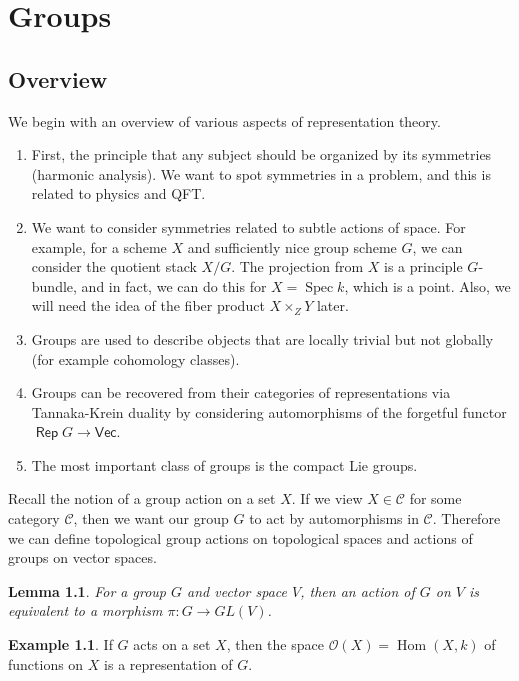 \documentclass[leqno, openany]{memoir}
\newtheorem{lem}[thm]{Lemma}
\theoremstyle{definition}
\newtheorem{exm}[thm]{Example}
\theoremstyle{remark}
\theoremstyle{plain}
\theoremstyle{definition}
\theoremstyle{remark}
\newcommand{\mc}[1]{\mathcal{#1}}
\newcommand{\Vect}{\mathsf{Vec}}
\DeclareMathOperator{\Rep}{\mathsf{Rep}}
\DeclareMathOperator{\Hom}{Hom}
\begin{document}
\chapter{Groups}%
\label{cha:groups}

\section{Overview}%
\label{sec:overview}

We begin with an overview of various aspects of representation theory.
\begin{enumerate}
    \item First, the principle that any subject should be organized by its symmetries (harmonic analysis). We want to spot symmetries in a problem, and this is related to physics and QFT.
    \item We want to consider symmetries related to subtle actions of space. For example, for a scheme $X$ and sufficiently nice group scheme $G$, we can consider the quotient stack $X / G$. The projection from $X$ is a principle $G$-bundle, and in fact, we can do this for $X = \operatorname{Spec} k$, which is a point. Also, we will need the idea of the fiber product $X \times_Z Y$ later.
    \item Groups are used to describe objects that are locally trivial but not globally (for example cohomology classes).
    \item Groups can be recovered from their categories of representations via Tannaka-Krein duality by considering automorphisms of the forgetful functor $\Rep G \to \Vect$.
    \item The most important class of groups is the compact Lie groups.
\end{enumerate}

Recall the notion of a group action on a set $X$. If we view $X \in \mc{C}$ for some category $\mc{C}$, then we want our group $G$ to act by automorphisms in $\mc{C}$. Therefore we can define topological group actions on topological spaces and actions of groups on vector spaces.

\begin{lem}
    For a group $G$ and vector space $V$, then an action of $G$ on $V$ is equivalent to a morphism $\pi: G \to GL(V)$.
\end{lem}

\begin{exm}
    If $G$ acts on a set $X$, then the space $\mc{O}(X) = \Hom(X,k)$ of functions on $X$ is a representation of $G$.
\end{exm}
\end{document}
